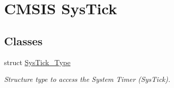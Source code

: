 \hypertarget{group___c_m_s_i_s___sys_tick}{\section{\-C\-M\-S\-I\-S \-Sys\-Tick}
\label{group___c_m_s_i_s___sys_tick}
}
\subsection*{\-Classes}
\begin{DoxyCompactItemize}
\item 
struct \hyperlink{struct_sys_tick___type}{\-Sys\-Tick\-\_\-\-Type}
\begin{DoxyCompactList}\small\item\em \-Structure type to access the \-System \-Timer (\-Sys\-Tick). \end{DoxyCompactList}\end{DoxyCompactItemize}

